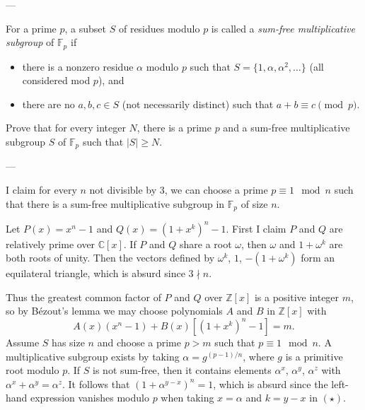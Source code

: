 
---

For a prime $p$, a subset $S$ of residues modulo $p$ is called a \emph{sum-free multiplicative subgroup} of $\mathbb F_p$ if
\begin{itemize}
    \item there is a nonzero residue $\alpha$ modulo $p$ such that $S=\{1,\alpha,\alpha^2,\ldots\}$ (all considered mod $p$), and
    \item there are no $a,b,c\in S$ (not necessarily distinct) such that $a+b\equiv c\pmod p$.
\end{itemize}
Prove that for every integer $N$, there is a prime $p$ and a sum-free multiplicative subgroup $S$ of $\mathbb F_p$ such that $|S|\ge N$.

---

I claim for every $n$ not divisible by $3$, we can choose a prime $p\equiv1\mod n$ such that there is a sum-free multiplicative subgroup in $\mathbb F_p$ of size $n$.

Let $P(x)=x^n-1$ and $Q(x)=(1+x^k)^n-1$. First I claim $P$ and $Q$ are relatively prime over $\mathbb C[x]$. If $P$ and $Q$ share a root $\omega$, then $\omega$ and $1+\omega^k$ are both roots of unity. Then the vectors defined by $\omega^k$, $1$, $-(1+\omega^k)$ form an equilateral triangle, which is absurd since $3\nmid n$.

Thus the greatest common factor of $P$ and $Q$ over $\mathbb Z[x]$ is a positive integer $m$, so by B\'ezout's lemma we may choose polynomials $A$ and $B$ in $\mathbb Z[x]$ with
\begin{equation}
    A(x)\left(x^n-1\right)+B(x)\left[\left(1+x^k\right)^n-1\right]=m.\tag{$*$}
\end{equation}
Assume $S$ has size $n$ and choose a prime $p>m$ such that $p\equiv1\mod n$. A multiplicative subgroup exists by taking $\alpha=g^{(p-1)/n}$, where $g$ is a primitive root modulo $p$. If $S$ is not sum-free, then it contains elements $\alpha^x$, $\alpha^y$, $\alpha^z$ with $\alpha^x+\alpha^y=\alpha^z$. It follows that $(1+\alpha^{y-x})^n=1$, which is absurd since the left-hand expression vanishes modulo $p$ when taking $x=\alpha$ and $k=y-x$ in $(\star)$.


